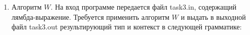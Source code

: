 \documentclass[12pt,a4paper,oneside]{article}
\begin{document}
\begin{enumerate}
%
%
%
%
%
\item Алгоритм $W$.
На вход программе передается файл task3.in, содержащий лямбда-выражение.
Требуется применить алгоритм $W$ и выдать в выходной файл task3.out результирующий тип и контекст
в следующей грамматике:


\end{enumerate}
\end{document}
